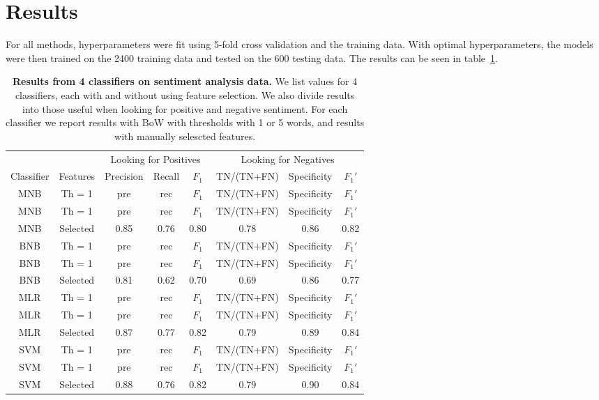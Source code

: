 \documentclass{article} %
\begin{document}
	\section{Results}
	
	For all methods, hyperparameters were fit using 5-fold cross validation and the training data. With optimal hyperparameters, the models were then trained on the 2400 training data and tested on the 600 testing data. The results can be seen in table~\ref{tab:results}.
	
	\begin{table}[h]
		\centering
		\begin{tabular}[]{@{}|c|c|c|c|c|c|c|c|@{}}
			\hline
			\multicolumn{2}{|c|}{} & \multicolumn{3}{c}{Looking for Positives} & \multicolumn{3}{c|}{Looking for Negatives} \\
			\cline{3-8}
			Classifier& Features& Precision& Recall& $F_1$& TN/(TN+FN)& Specificity & $F_1'$ \\
			\hline
			\hline
			MNB & Th = 1  & pre & rec & $F_1$& TN/(TN+FN)& Specificity & $F_1'$ \\
			MNB & Th = 1  & pre & rec & $F_1$& TN/(TN+FN)& Specificity & $F_1'$ \\
			MNB & Selected & 0.85 & 0.76 & 0.80& 0.78& 0.86 & 0.82 \\
			BNB & Th = 1  & pre & rec & $F_1$& TN/(TN+FN)& Specificity & $F_1'$ \\
			BNB & Th = 1  & pre & rec & $F_1$& TN/(TN+FN)& Specificity & $F_1'$ \\
			BNB & Selected & 0.81 & 0.62 & 0.70& 0.69& 0.86 & 0.77 \\
			MLR & Th = 1  & pre & rec & $F_1$& TN/(TN+FN)& Specificity & $F_1'$ \\
			MLR & Th = 1  & pre & rec & $F_1$& TN/(TN+FN)& Specificity & $F_1'$ \\
			MLR & Selected & 0.87 & 0.77 & 0.82& 0.79& 0.89 & 0.84 \\
			SVM & Th = 1  & pre & rec & $F_1$& TN/(TN+FN)& Specificity & $F_1'$ \\
			SVM & Th = 1  & pre & rec & $F_1$& TN/(TN+FN)& Specificity & $F_1'$ \\
			SVM & Selected & 0.88 & 0.76 & 0.82& 0.79& 0.90 & 0.84 \\
			\hline
		\end{tabular}
		\caption{{\bf Results from 4 classifiers on sentiment analysis data.} We list values for 4 classifiers, each with and without using feature selection. We also divide results into those useful when looking for positive and negative sentiment. For each classifier we report results with BoW with thresholds with 1 or 5 words, and results with manually selescted features.}
		\label{tab:results}
	\end{table}
	
\end{document}
